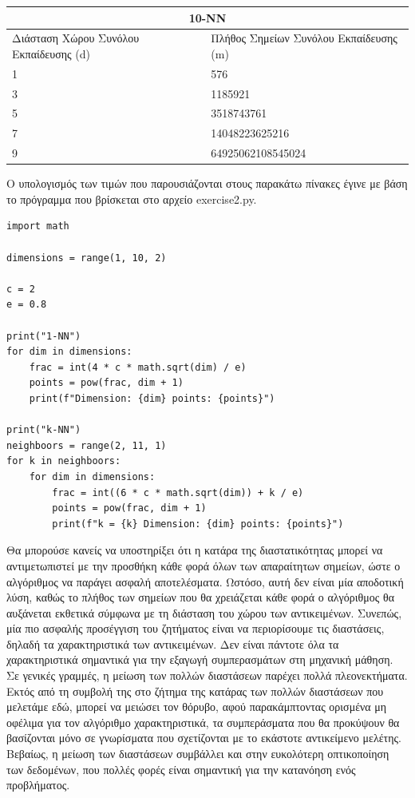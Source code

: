 \documentclass[12pt]{article}
\begin{document}
\medspace

\begin{tabular}{ |p{8cm}|p{8cm}|  }
	\hline
	\multicolumn{2}{|c|}{10-NN} \\
	\hline
	Διάσταση Χώρου Συνόλου Εκπαίδευσης (d) & Πλήθος Σημείων Συνόλου Εκπαίδευσης (m)\\
	\hline
	1   & 576    \\
	3   & 1185921    \\
	5   & 3518743761    \\
	7   & 14048223625216    \\
	9   & 64925062108545024    \\
	\hline
\end{tabular}

\medspace

Ο υπολογισμός των τιμών που παρουσιάζονται στους παρακάτω πίνακες έγινε με βάση το πρόγραμμα που βρίσκεται στο αρχείο exercise2.py. 

\begin{lstlisting}
import math

dimensions = range(1, 10, 2)

c = 2
e = 0.8

print("1-NN")
for dim in dimensions:
	frac = int(4 * c * math.sqrt(dim) / e)
	points = pow(frac, dim + 1)
	print(f"Dimension: {dim} points: {points}")

print("k-NN")
neighboors = range(2, 11, 1)
for k in neighboors:
	for dim in dimensions:
		frac = int((6 * c * math.sqrt(dim)) + k / e)
		points = pow(frac, dim + 1)
		print(f"k = {k} Dimension: {dim} points: {points}")            
\end{lstlisting}

Θα μπορούσε κανείς να υποστηρίξει ότι η κατάρα της διαστατικότητας μπορεί να αντιμετωπιστεί με την προσθήκη κάθε φορά όλων των απαραίτητων σημείων, ώστε ο αλγόριθμος να παράγει ασφαλή αποτελέσματα. Ωστόσο, αυτή δεν είναι μία αποδοτική λύση, καθώς το πλήθος των σημείων που θα χρειάζεται κάθε φορά ο αλγόριθμος θα αυξάνεται εκθετικά σύμφωνα με τη διάσταση του χώρου των αντικειμένων. Συνεπώς, μία πιο ασφαλής προσέγγιση του ζητήματος είναι να περιορίσουμε τις διαστάσεις, δηλαδή τα χαρακτηριστικά των αντικειμένων. Δεν είναι πάντοτε όλα τα χαρακτηριστικά σημαντικά για την εξαγωγή συμπερασμάτων στη μηχανική μάθηση. \\

Σε γενικές γραμμές, η μείωση των πολλών διαστάσεων παρέχει πολλά πλεονεκτήματα. Εκτός από τη συμβολή της στο ζήτημα της κατάρας των πολλών διαστάσεων που μελετάμε εδώ, μπορεί να μειώσει τον θόρυβο, αφού παρακάμπτοντας ορισμένα μη οφέλιμα για τον αλγόριθμο χαρακτηριστικά, τα συμπεράσματα που θα προκύψουν θα βασίζονται μόνο σε γνωρίσματα που σχετίζονται με το εκάστοτε αντικείμενο μελέτης. Βεβαίως, η μείωση των διαστάσεων συμβάλλει και στην ευκολότερη οπτικοποίηση των δεδομένων, που πολλές φορές είναι σημαντική για την κατανόηση ενός προβλήματος. \\
\end{document}
